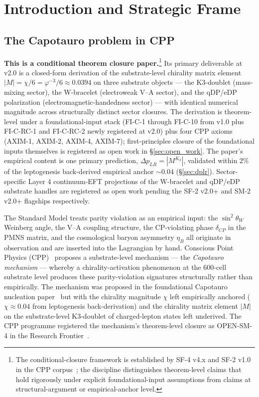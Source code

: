 \documentclass[11pt,letterpaper]{article}
\newcommand{\phig}{\varphi}
\newcommand{\Kthree}{\ensuremath{K_3}}
\newcommand{\DeltapLR}{\Delta p_{LR}}
\begin{document}
\bigskip
\raggedright
\tableofcontents
\newpage

\section{Introduction and Strategic Frame}\label{sec:introduction}

\subsection{The Capotauro problem in CPP}\label{sec:cap_problem}

\textbf{This is a conditional theorem closure paper.}\footnote{The conditional-closure framework is established by SF-4 v4.x and SF-2 v1.0 in the CPP corpus~\cite{abshier_conditional_closure}; the discipline distinguishes theorem-level claims that hold rigorously under explicit foundational-input assumptions from claims at structural-argument or empirical-anchor level.} Its primary deliverable at v2.0 is a closed-form derivation of the substrate-level chirality matrix element $|M| = \chi/6 = \phig^{-3}/6 \approx 0.0394$ on three substrate objects --- the K3-doublet (mass-mixing sector), the W-bracelet (electroweak V--A sector), and the qDP/eDP polarization (electromagnetic-handedness sector) --- with identical numerical magnitude across structurally distinct sector closures. The derivation is theorem-level under a foundational-input stack (FI-C-1 through FI-C-10 from v1.0 plus FI-C-RC-1 and FI-C-RC-2 newly registered at v2.0) plus four CPP axioms (AXIM-1, AXIM-2, AXIM-4, AXIM-7); first-principles closure of the foundational inputs themselves is registered as open work in \S\ref{sec:open_work}. The paper's empirical content is one primary prediction, $\DeltapLR = |M^{\Kthree}|$, validated within $2\%$ of the leptogenesis back-derived empirical anchor $\sim 0.04$ (\S\ref{sec:dplr}). Sector-specific Layer 4 continuum-EFT projections of the W-bracelet and qDP/eDP substrate handles are registered as open work pending the SF-2 v2.0+ and SM-2 v2.0+ flagships respectively.

The Standard Model treats parity violation as an empirical input: the $\sin^2\theta_W$ Weinberg angle, the V--A coupling structure, the CP-violating phase $\delta_{CP}$ in the PMNS matrix, and the cosmological baryon asymmetry $\eta_B$ all originate in observation and are inserted into the Lagrangian by hand. Conscious Point Physics (CPP)~\cite{abshier_axiom_registry,abshier_theorem_registry} proposes a substrate-level mechanism --- the \emph{Capotauro mechanism} --- whereby a chirality-activation phenomenon at the 600-cell substrate level produces these parity-violation signatures structurally rather than empirically. The mechanism was proposed in the foundational Capotauro nucleation paper~\cite{abshier_grok_capotauro_2025} but with the chirality magnitude $\chi$ left empirically anchored ($\chi \approx 0.04$ from leptogenesis back-derivation) and the chirality matrix element $|M|$ on the substrate-level K3-doublet of charged-lepton states left underived. The CPP programme registered the mechanism's theorem-level closure as OPEN-SM-4 in the Research Frontier~\cite{abshier_research_frontier}.
\end{document}
